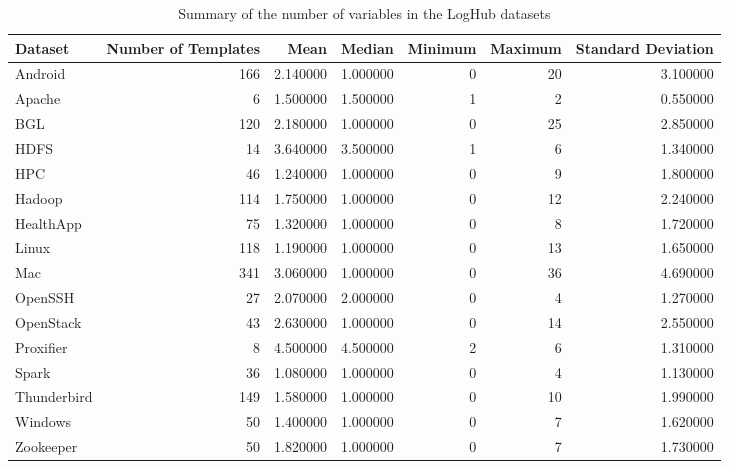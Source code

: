 \begin{table}
\caption{Summary of the number of variables in the LogHub datasets}
\label{tab:loghub_variable_instance_summary}
\begin{tabular}{lrrrrrr}
\toprule
Dataset & Number of Templates & Mean & Median & Minimum & Maximum & Standard Deviation \\
\midrule
Android & 166 & 2.140000 & 1.000000 & 0 & 20 & 3.100000 \\
Apache & 6 & 1.500000 & 1.500000 & 1 & 2 & 0.550000 \\
BGL & 120 & 2.180000 & 1.000000 & 0 & 25 & 2.850000 \\
HDFS & 14 & 3.640000 & 3.500000 & 1 & 6 & 1.340000 \\
HPC & 46 & 1.240000 & 1.000000 & 0 & 9 & 1.800000 \\
Hadoop & 114 & 1.750000 & 1.000000 & 0 & 12 & 2.240000 \\
HealthApp & 75 & 1.320000 & 1.000000 & 0 & 8 & 1.720000 \\
Linux & 118 & 1.190000 & 1.000000 & 0 & 13 & 1.650000 \\
Mac & 341 & 3.060000 & 1.000000 & 0 & 36 & 4.690000 \\
OpenSSH & 27 & 2.070000 & 2.000000 & 0 & 4 & 1.270000 \\
OpenStack & 43 & 2.630000 & 1.000000 & 0 & 14 & 2.550000 \\
Proxifier & 8 & 4.500000 & 4.500000 & 2 & 6 & 1.310000 \\
Spark & 36 & 1.080000 & 1.000000 & 0 & 4 & 1.130000 \\
Thunderbird & 149 & 1.580000 & 1.000000 & 0 & 10 & 1.990000 \\
Windows & 50 & 1.400000 & 1.000000 & 0 & 7 & 1.620000 \\
Zookeeper & 50 & 1.820000 & 1.000000 & 0 & 7 & 1.730000 \\
\bottomrule
\end{tabular}
\end{table}
